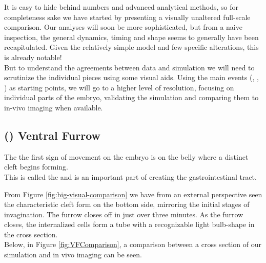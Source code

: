 It is easy to hide behind numbers and advanced analytical methods, so for completeness sake we have started by presenting a visually unaltered full-scale comparison. Our analyses will soon be more sophisticated, but from a naive inspection, the general dynamics, timing and shape seems to generally have been recapitulated. Given the relatively simple model and few specific alterations, this is already notable! \\ 


But to understand the agreements between data and simulation we will need to scrutinize the individual pieces using some visual aids. Using the main events (, , ) as starting points, we will go to a higher level of resolution, focusing on individual parts of the embryo, validating the simulation and comparing them to in-vivo imaging when available.


\subsection{() Ventral Furrow }
The the first sign of movement on the embryo is on the belly where a distinct cleft begins forming. \\
This is called the  and is an important part of creating the gastrointestinal tract.

From Figure \ref{fig:big-visual-comparison} we have from an external perspective seen the characteristic cleft form on the bottom side, mirroring the initial stages of invagination. The furrow closes off in just over three minutes.\cite{holly2015rapid}
As the furrow closes, the internalized cells form a tube with a recognizable light bulb-shape in the cross section. \\

Below, in Figure \ref{fig:VFComparison}, a comparison between a cross section of our simulation and in vivo imaging can be seen.

